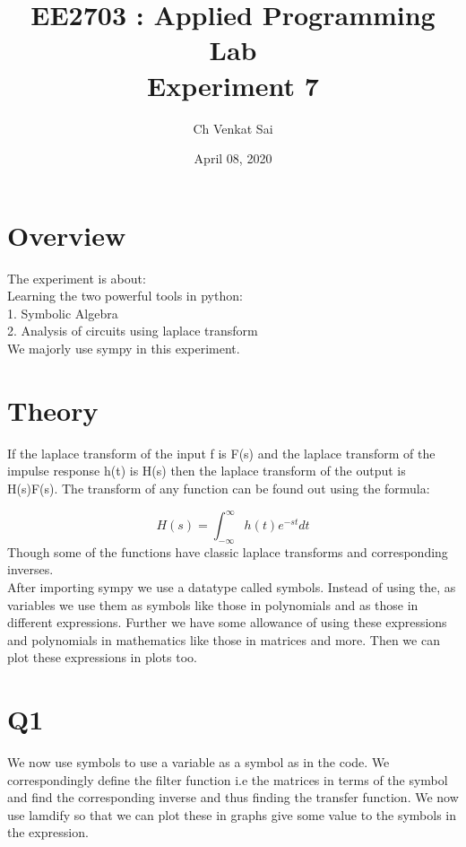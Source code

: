 \documentclass[12pt, a4paper]{report}
\title{\textbf{EE2703 : Applied Programming Lab \\ Experiment 7}} %
\author{Ch Venkat Sai} %
\date{April 08, 2020} %
\begin{document}
		
		
\maketitle %
\section*{Overview}
The experiment is about:\\
Learning the two powerful tools in python:\\
1. Symbolic Algebra\\
2. Analysis of circuits using laplace transform\\
We majorly use sympy in this experiment.

\section*{Theory}
If the laplace transform of the input f is F(s) and the laplace transform of the impulse response h(t) is H(s) then the laplace transform of the output is H(s)F(s). The transform of any function can be found out using the formula:

 \begin{equation}
H(s) = \int_{-\infty}^{\infty}h(t)e^{-st}dt
 \end{equation}
Though some of the functions have classic laplace transforms and corresponding inverses.\\
After importing sympy we use a datatype called symbols. Instead of using the, as variables we use them as symbols like those in polynomials and as those in different expressions. Further we have some allowance of using these expressions and polynomials in mathematics like those in matrices and more. Then we can plot these expressions in plots too.
 
\section*{Q1}
We now use symbols to use a variable as a symbol as in the code. We correspondingly define the filter function i.e the matrices in terms of the symbol and find the corresponding inverse and thus finding the transfer function. We now use lamdify so that we can plot these in graphs give some value to the symbols in the expression.
\end{document}
